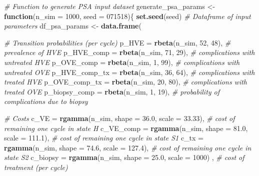 \documentclass[
]{article}
\newenvironment{Shaded}{\begin{snugshade}}{\end{snugshade}}
\newcommand{\CommentTok}[1]{\textcolor[rgb]{0.56,0.35,0.01}{\textit{#1}}}
\newcommand{\ControlFlowTok}[1]{\textcolor[rgb]{0.13,0.29,0.53}{\textbf{#1}}}
\newcommand{\DataTypeTok}[1]{\textcolor[rgb]{0.13,0.29,0.53}{#1}}
\newcommand{\DecValTok}[1]{\textcolor[rgb]{0.00,0.00,0.81}{#1}}
\newcommand{\FloatTok}[1]{\textcolor[rgb]{0.00,0.00,0.81}{#1}}
\newcommand{\KeywordTok}[1]{\textcolor[rgb]{0.13,0.29,0.53}{\textbf{#1}}}
\newcommand{\NormalTok}[1]{#1}
\newcommand{\StringTok}[1]{\textcolor[rgb]{0.31,0.60,0.02}{#1}}
\begin{document}
\begin{Shaded}
\begin{Highlighting}[]
\CommentTok{# Function to generate PSA input dataset}
\NormalTok{generate_psa_params <-}\StringTok{ }\ControlFlowTok{function}\NormalTok{(}\DataTypeTok{n_sim =} \DecValTok{1000}\NormalTok{, }\DataTypeTok{seed =} \DecValTok{071518}\NormalTok{)\{}
  \KeywordTok{set.seed}\NormalTok{(seed)}
  \CommentTok{# Dataframe of input parameters}
\NormalTok{  df_psa_params   <-}\StringTok{ }\KeywordTok{data.frame}\NormalTok{(}
    
    \CommentTok{# Transition probabilities (per cycle)}
    \DataTypeTok{p_HVE         =} \KeywordTok{rbeta}\NormalTok{(n_sim, }\DecValTok{52}\NormalTok{, }\DecValTok{48}\NormalTok{), }\CommentTok{# prevalence of HVE}
    \DataTypeTok{p_HVE_comp    =} \KeywordTok{rbeta}\NormalTok{(n_sim, }\DecValTok{71}\NormalTok{, }\DecValTok{29}\NormalTok{), }\CommentTok{# complications with untreated HVE}
    \DataTypeTok{p_OVE_comp    =} \KeywordTok{rbeta}\NormalTok{(n_sim,  }\DecValTok{1}\NormalTok{, }\DecValTok{99}\NormalTok{), }\CommentTok{# complications with untreated OVE}
    \DataTypeTok{p_HVE_comp_tx =} \KeywordTok{rbeta}\NormalTok{(n_sim, }\DecValTok{36}\NormalTok{, }\DecValTok{64}\NormalTok{), }\CommentTok{# complications with treated HVE}
    \DataTypeTok{p_OVE_comp_tx =} \KeywordTok{rbeta}\NormalTok{(n_sim, }\DecValTok{20}\NormalTok{, }\DecValTok{80}\NormalTok{), }\CommentTok{# complications with treated OVE}
    \DataTypeTok{p_biopsy_comp =} \KeywordTok{rbeta}\NormalTok{(n_sim,  }\DecValTok{1}\NormalTok{, }\DecValTok{19}\NormalTok{), }\CommentTok{# probability of complications due to biopsy}
    
    \CommentTok{# Costs}
    \DataTypeTok{c_VE      =} \KeywordTok{rgamma}\NormalTok{(n_sim, }\DataTypeTok{shape =} \FloatTok{36.0}\NormalTok{, }\DataTypeTok{scale =} \FloatTok{33.33}\NormalTok{), }\CommentTok{# cost of remaining one cycle in state H}
    \DataTypeTok{c_VE_comp =} \KeywordTok{rgamma}\NormalTok{(n_sim, }\DataTypeTok{shape =} \FloatTok{81.0}\NormalTok{, }\DataTypeTok{scale =} \FloatTok{111.1}\NormalTok{), }\CommentTok{# cost of remaining one cycle in state S1}
    \DataTypeTok{c_tx      =} \KeywordTok{rgamma}\NormalTok{(n_sim, }\DataTypeTok{shape =} \FloatTok{74.6}\NormalTok{, }\DataTypeTok{scale =} \FloatTok{127.4}\NormalTok{), }\CommentTok{# cost of remaining one cycle in state S2}
    \DataTypeTok{c_biopsy  =} \KeywordTok{rgamma}\NormalTok{(n_sim, }\DataTypeTok{shape =} \FloatTok{25.0}\NormalTok{, }\DataTypeTok{scale =} \DecValTok{1000}\NormalTok{) , }\CommentTok{# cost of treatment (per cycle)}
    

\end{Highlighting}
\end{Shaded}
\end{document}
